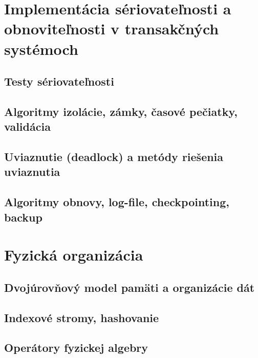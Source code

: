 \documentclass[10pt,a4paper]{article}
\begin{document}
\section{Implementácia sériovateľnosti a obnoviteľnosti v transakčných systémoch} 
\subsection{Testy sériovateľnosti}
\subsection{Algoritmy izolácie, zámky, časové pečiatky, validácia}
\subsection{Uviaznutie (deadlock) a metódy riešenia uviaznutia}
\subsection{Algoritmy obnovy, log-file, checkpointing, backup}
    
\section{Fyzická organizácia} 
\label{fyzicka_organizacia}

\subsection{Dvojúrovňový model pamäti a organizácie dát}
\subsection{Indexové stromy, hashovanie}
\subsection{Operátory fyzickej algebry}
\end{document}
